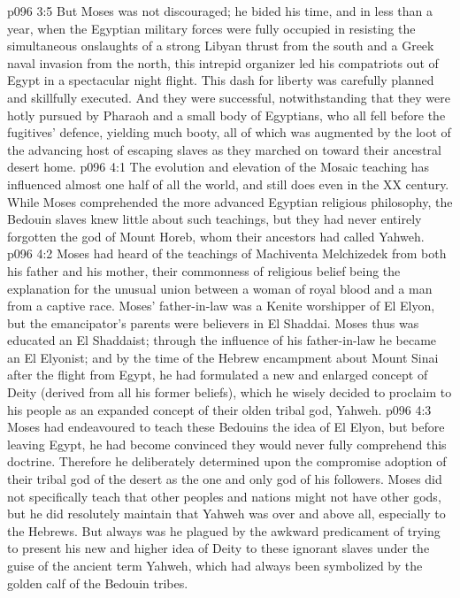\vs p096 3:5 But Moses was not discouraged; he bided his time, and in less than a year, when the Egyptian military forces were fully occupied in resisting the simultaneous onslaughts of a strong Libyan thrust from the south and a Greek naval invasion from the north, this intrepid organizer led his compatriots out of Egypt in a spectacular night flight. This dash for liberty was carefully planned and skillfully executed. And they were successful, notwithstanding that they were hotly pursued by Pharaoh and a small body of Egyptians, who all fell before the fugitives’ defence, yielding much booty, all of which was augmented by the loot of the advancing host of escaping slaves as they marched on toward their ancestral desert home.
\vs p096 4:1 The evolution and elevation of the Mosaic teaching has influenced almost one half of all the world, and still does even in the XX century. While Moses comprehended the more advanced Egyptian religious philosophy, the Bedouin slaves knew little about such teachings, but they had never entirely forgotten the god of Mount Horeb, whom their ancestors had called Yahweh.
\vs p096 4:2 Moses had heard of the teachings of Machiventa Melchizedek from both his father and his mother, their commonness of religious belief being the explanation for the unusual union between a woman of royal blood and a man from a captive race. Moses’ father\hyp{}in\hyp{}law was a Kenite worshipper of El Elyon, but the emancipator’s parents were believers in El Shaddai. Moses thus was educated an El Shaddaist; through the influence of his father\hyp{}in\hyp{}law he became an El Elyonist; and by the time of the Hebrew encampment about Mount Sinai after the flight from Egypt, he had formulated a new and enlarged concept of Deity (derived from all his former beliefs), which he wisely decided to proclaim to his people as an expanded concept of their olden tribal god, Yahweh.
\vs p096 4:3 Moses had endeavoured to teach these Bedouins the idea of El Elyon, but before leaving Egypt, he had become convinced they would never fully comprehend this doctrine. Therefore he deliberately determined upon the compromise adoption of their tribal god of the desert as the one and only god of his followers. Moses did not specifically teach that other peoples and nations might not have other gods, but he did resolutely maintain that Yahweh was over and above all, especially to the Hebrews. But always was he plagued by the awkward predicament of trying to present his new and higher idea of Deity to these ignorant slaves under the guise of the ancient term Yahweh, which had always been symbolized by the golden calf of the Bedouin tribes.
